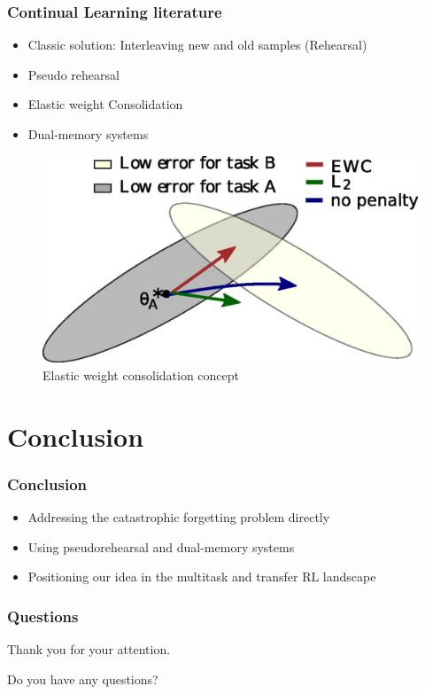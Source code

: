 \documentclass{beamer}
\theoremstyle{remark}
\theoremstyle{plain}
\begin{document}
\begin{frame}
 \frametitle{Continual Learning literature}
\begin{itemize}
    \item Classic solution: Interleaving new and old samples (Rehearsal)
    \item Pseudo rehearsal \cite{RobinsConsolidationBrain}
    \item Elastic weight Consolidation \cite{Kirkpatrick2017OvercomingNetworks.}
    \item Dual-memory systems \cite{Parisi2018ContinualReview}
\end{itemize}
\begin{figure}
    \centering
    \includegraphics[scale=0.6]{figs/ewc.jpg}
    \caption{Elastic weight consolidation concept}
    \label{fig:my_label}
\end{figure}
  
\end{frame}


\section{Conclusion}
\label{sec:continual}
\begin{frame}
\frametitle{Conclusion}
\begin{itemize}
    \item Addressing the catastrophic forgetting problem directly
    \item Using pseudorehearsal and dual-memory systems
    \item Positioning our idea in the multitask and transfer RL landscape
\end{itemize}
\end{frame}



\begin{frame}
  \frametitle{Questions}
  \begin{center}
    Thank you for your attention.

    Do you have any questions?
  \end{center}
\end{frame}
\end{document}
